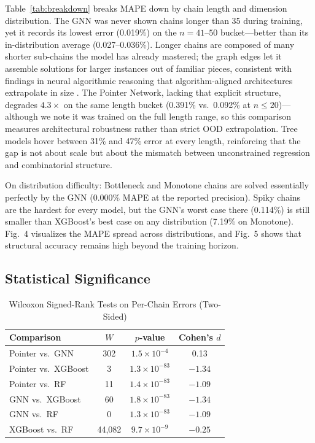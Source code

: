 \documentclass[conference]{IEEEtran}
\begin{document}
Table~\ref{tab:breakdown} breaks MAPE down by chain length and dimension
distribution. The GNN was never shown chains longer than 35 during training,
yet it records its lowest error (0.019\%) on the $n{=}41$--$50$
bucket---better than its in-distribution average (0.027--0.036\%). Longer
chains are composed of many shorter sub-chains the model has already mastered;
the graph edges let it assemble solutions for larger instances out of familiar
pieces, consistent with findings in neural algorithmic reasoning that
algorithm-aligned architectures extrapolate in size
\cite{velickovic2022clrs,ibarz2022generalist}. The Pointer Network, lacking
that explicit structure, degrades $4.3\times$ on the same length bucket
(0.391\% vs.\ 0.092\% at $n{\le}20$)---although we note it was trained on the
full length range, so this comparison measures architectural robustness rather
than strict OOD extrapolation. Tree models hover between 31\% and 47\% error
at every length, reinforcing that the gap is not about scale but about the
mismatch between unconstrained regression and combinatorial structure.

On distribution difficulty: Bottleneck and Monotone chains are solved
essentially perfectly by the GNN (0.000\% MAPE at the reported precision).
Spiky chains are the hardest for every model, but the GNN's worst case there
(0.114\%) is still smaller than XGBoost's best case on any distribution
(7.19\% on Monotone). Fig.~4 visualizes the MAPE spread across distributions,
and Fig.~5 shows that structural accuracy remains high beyond the training
horizon.

\subsection{Statistical Significance}

\begin{table}[t]
\caption{Wilcoxon Signed-Rank Tests on Per-Chain Errors (Two-Sided)}
\label{tab:wilcoxon}
\centering
\setlength{\tabcolsep}{4pt}
\begin{tabular}{lccc}
\toprule
Comparison & $W$ & $p$-value & Cohen's $d$ \\
\midrule
Pointer vs.\ GNN     & 302    & $1.5 \times 10^{-4}$  & 0.13 \\
Pointer vs.\ XGBoost & 3      & $1.3 \times 10^{-83}$ & $-1.34$ \\
Pointer vs.\ RF      & 11     & $1.4 \times 10^{-83}$ & $-1.09$ \\
GNN vs.\ XGBoost     & 60     & $1.8 \times 10^{-83}$ & $-1.34$ \\
GNN vs.\ RF          & 0      & $1.3 \times 10^{-83}$ & $-1.09$ \\
XGBoost vs.\ RF      & 44{,}082 & $9.7 \times 10^{-9}$ & $-0.25$ \\
\bottomrule
\end{tabular}
\end{table}
\end{document}
